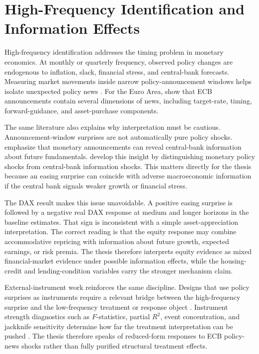 \section{High-Frequency Identification and Information Effects}

High-frequency identification addresses the timing problem in monetary economics. At monthly or quarterly frequency, observed policy changes are endogenous to inflation, slack, financial stress, and central-bank forecasts. Measuring market movements inside narrow policy-announcement windows helps isolate unexpected policy news \parencite{Kuttner2001,GertlerKaradi2015}. For the Euro Area, \textcite{Altavilla2019} show that ECB announcements contain several dimensions of news, including target-rate, timing, forward-guidance, and asset-purchase components.

The same literature also explains why interpretation must be cautious. Announcement-window surprises are not automatically pure policy shocks. \textcite{NakamuraSteinsson2018} emphasize that monetary announcements can reveal central-bank information about future fundamentals. \textcite{JarocinskiKaradi2020} develop this insight by distinguishing monetary policy shocks from central-bank information shocks. This matters directly for the thesis because an easing surprise can coincide with adverse macroeconomic information if the central bank signals weaker growth or financial stress.

The DAX result makes this issue unavoidable. A positive easing surprise is followed by a negative real DAX response at medium and longer horizons in the baseline estimates. That sign is inconsistent with a simple asset-appreciation interpretation. The correct reading is that the equity response may combine accommodative repricing with information about future growth, expected earnings, or risk premia. The thesis therefore interprets equity evidence as mixed financial-market evidence under possible information effects, while the housing-credit and lending-condition variables carry the stronger mechanism claim.

External-instrument work reinforces the same discipline. Designs that use policy surprises as instruments require a relevant bridge between the high-frequency surprise and the low-frequency treatment or response object \parencite{MertensRavn2013,StockWatson2018}. Instrument strength diagnostics such as \(F\)-statistics, partial \(R^2\), event concentration, and jackknife sensitivity determine how far the treatment interpretation can be pushed \parencite{StockYogo2005}. The thesis therefore speaks of reduced-form responses to ECB policy-news shocks rather than fully purified structural treatment effects.

